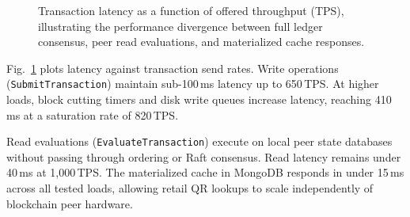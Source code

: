 \documentclass[conference]{IEEEtran}
\begin{document}
\begin{figure}[htbp]
\centering
{}
\caption{Transaction latency as a function of offered throughput (TPS), illustrating the performance divergence between full ledger consensus, peer read evaluations, and materialized cache responses.}
\label{fig:latency_tps}
\end{figure}

Fig.~\ref{fig:latency_tps} plots latency against transaction send rates. Write operations (\texttt{SubmitTransaction}) maintain sub-100\,ms latency up to 650\,TPS. At higher loads, block cutting timers and disk write queues increase latency, reaching 410\,ms at a saturation rate of 820\,TPS.

Read evaluations (\texttt{EvaluateTransaction}) execute on local peer state databases without passing through ordering or Raft consensus. Read latency remains under 40\,ms at 1,000\,TPS. The materialized cache in MongoDB responds in under 15\,ms across all tested loads, allowing retail QR lookups to scale independently of blockchain peer hardware.
\end{document}
